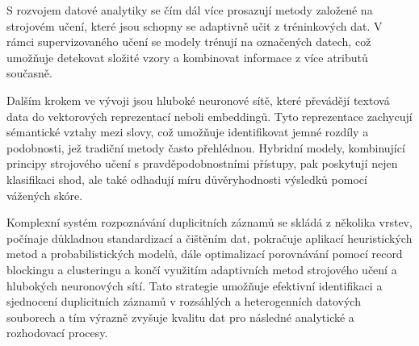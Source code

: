 S rozvojem datové analytiky se čím dál více prosazují metody založené na strojovém učení, které jsou schopny se adaptivně učit z tréninkových dat. V rámci supervizovaného učení se modely trénují na označených datech, což umožňuje detekovat složité vzory a kombinovat informace z více atributů současně.

Dalším krokem ve vývoji jsou hluboké neuronové sítě, které převádějí textová data do vektorových reprezentací neboli embeddingů. Tyto reprezentace zachycují sémantické vztahy mezi slovy, což umožňuje identifikovat jemné rozdíly a podobnosti, jež tradiční metody často přehlédnou. Hybridní modely, kombinující principy strojového učení s pravděpodobnostními přístupy, pak poskytují nejen klasifikaci shod, ale také odhadují míru důvěryhodnosti výsledků pomocí vážených skóre.

Komplexní systém rozpoznávání duplicitních záznamů se skládá z několika vrstev, počínaje důkladnou standardizací a čištěním dat, pokračuje aplikací heuristických metod a probabilistických modelů, dále optimalizací porovnávání pomocí record blockingu a clusteringu a končí využitím adaptivních metod strojového učení a hlubokých neuronových sítí. Tato strategie umožňuje efektivní identifikaci a sjednocení duplicitních záznamů v rozsáhlých a heterogenních datových souborech a tím výrazně zvyšuje kvalitu dat pro následné analytické a rozhodovací procesy.


